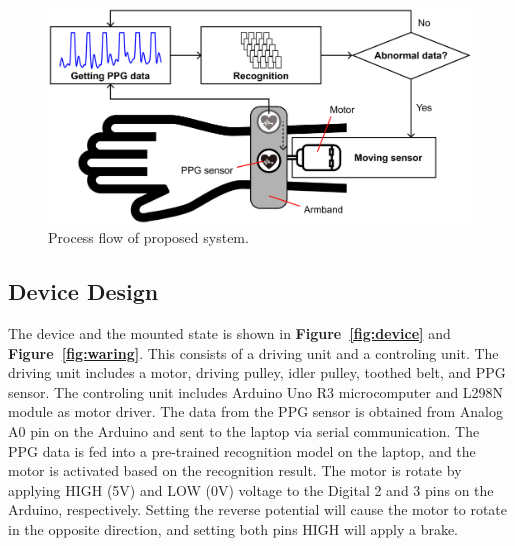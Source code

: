 \documentclass[sigconf, anonymous]{acmart}
\newcommand\figref[1]{\textbf{Figure~\ref{fig:#1}}}
\begin{document}
\begin{figure}[!t]
  \centering
  \includegraphics[width=1\linewidth]{figures/system.eps}
  \caption{Process flow of proposed system.}
  \label{fig:system}
\end{figure}


\subsection{Device Design}
The device and the mounted state is shown in \figref{device} and \figref{waring}. This consists of a driving unit and a controling unit. The driving unit includes a motor, driving pulley, idler pulley, toothed belt, and PPG sensor. The controling unit includes Arduino Uno R3 microcomputer and L298N module as motor driver. The data from the PPG sensor is obtained from Analog A0 pin on the Arduino and sent to the laptop via serial communication. The PPG data is fed into a pre-trained recognition model on the laptop, and the motor is activated based on the recognition result. The motor is rotate by applying HIGH (5V) and LOW (0V) voltage to the Digital 2 and 3 pins on the Arduino, respectively. Setting the reverse potential will cause the motor to rotate in the opposite direction, and setting both pins HIGH will apply a brake.
\end{document}
